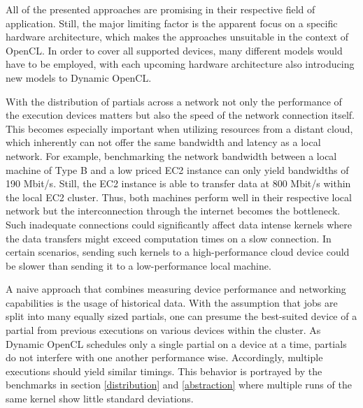 All of the presented approaches are promising in their respective field of application. Still, the major limiting factor is the apparent focus on a specific hardware architecture, which makes the approaches unsuitable in the context of OpenCL. In order to cover all supported devices, many different models would have to be employed, with each upcoming hardware architecture also introducing new models to Dynamic OpenCL.

With the distribution of partials across a network not only the performance of the execution devices matters but also the speed of the network connection itself. This becomes especially important when utilizing resources from a distant cloud, which inherently can not offer the same bandwidth and latency as a local network. For example, benchmarking the network bandwidth between a local machine of Type B and a low priced EC2 instance can only yield bandwidths of 190 Mbit/s. Still, the EC2 instance is able to transfer data at 800 Mbit/s within the local EC2 cluster. Thus, both machines perform well in their respective local network but the interconnection through the internet becomes the bottleneck. Such inadequate connections could significantly affect data intense kernels where the data transfers might exceed computation times on a slow connection. In certain scenarios, sending such kernels to a high-performance cloud device could be slower than sending it to a low-performance local machine.

A naive approach that combines measuring device performance and networking capabilities is the usage of historical data. With the assumption that jobs are split into many equally sized partials, one can presume the best-suited device of a partial from previous executions on various devices within the cluster. As Dynamic OpenCL schedules only a single partial on a device at a time, partials do not interfere with one another performance wise. Accordingly, multiple executions should yield similar timings. This behavior is portrayed by the benchmarks in section \ref{distribution} and \ref{abstraction} where multiple runs of the same kernel show little standard deviations.

